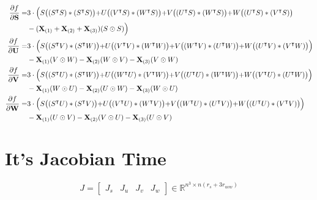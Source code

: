 \documentclass{article}
\begin{document}
\begin{eqnarray*}
        \frac{\partial f}{\partial \mathbf{S}} = & 3\cdot \Bigl(S\bigl((S^\intercal S)\ast (S^\intercal S)\bigl) + U\bigl((V^\intercal S)\ast(W^\intercal S)\bigl) + V\bigl((U^\intercal S)\ast(W^\intercal S)\bigl) + W\bigl((U^\intercal S)\ast(V^\intercal S)\bigl)\\ 
        & - (\mathbf{X}_{(1)} + \mathbf{X}_{(2)} + \mathbf{X}_{(3)})(S\odot S)\Bigl) \\
        \frac{\partial f}{\partial \mathbf{U}} = & 3\cdot \Bigl(S\bigl((S^\intercal V)\ast (S^\intercal W)\bigl) + U\bigl((V^\intercal V)\ast(W^\intercal W)\bigl) + V\bigl((W^\intercal V)\ast(U^\intercal W)\bigl) + W\bigl((U^\intercal V)\ast(V^\intercal W)\bigl)\Bigl)\\ 
        & - \mathbf{X}_{(1)}(V\odot W) - \mathbf{X}_{(2)}(W\odot V) - \mathbf{X}_{(3)}(V\odot W) \\
        \frac{\partial f}{\partial \mathbf{V}} = & 3\cdot \Bigl(S\bigl((S^\intercal U)\ast (S^\intercal W)\bigl) + U\bigl((W^\intercal U)\ast(V^\intercal W)\bigl) + V\bigl((U^\intercal U)\ast(W^\intercal W)\bigl) + W\bigl((V^\intercal U)\ast(U^\intercal W)\bigl)\Bigl)\\ 
        & - \mathbf{X}_{(1)}(W\odot U) - \mathbf{X}_{(2)}(U\odot W) - \mathbf{X}_{(3)}(W\odot U) \\
        \frac{\partial f}{\partial \mathbf{W}} = & 3\cdot \Bigl(S\bigl((S^\intercal U)\ast (S^\intercal V)\bigl) + U\bigl((V^\intercal U)\ast(W^\intercal V)\bigl) + V\bigl((W^\intercal U)\ast(U^\intercal V)\bigl) + W\bigl((U^\intercal U)\ast(V^\intercal V)\bigl)\Bigl)\\ 
        & - \mathbf{X}_{(1)}(U\odot V) - \mathbf{X}_{(2)}(V\odot U) - \mathbf{X}_{(3)}(U\odot V)
\end{eqnarray*}











\newpage
\section{It's Jacobian Time}
\begin{equation}
    J = 
    \begin{bmatrix}
        J_s & J_u & J_v & J_w 
    \end{bmatrix}
    \in \mathbb{R}^{n^3\times n(r_s + 3r_{uvw})}
\end{equation}
\end{document}
